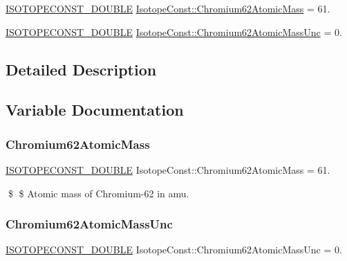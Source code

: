 \begin{DoxyCompactItemize}
\item 
\mbox{\hyperlink{group___isotope_const-_macros_ga8f45a7272ce02c0b4c65c44636ed719a}{I\+S\+O\+T\+O\+P\+E\+C\+O\+N\+S\+T\+\_\+\+D\+O\+U\+B\+LE}} \mbox{\hyperlink{group___isotope_const-_chromium-_cr62_gae5894c5ab7049922a1d31d4ed83e5e1f}{Isotope\+Const\+::\+Chromium62\+Atomic\+Mass}} = 61.
\item 
\mbox{\hyperlink{group___isotope_const-_macros_ga8f45a7272ce02c0b4c65c44636ed719a}{I\+S\+O\+T\+O\+P\+E\+C\+O\+N\+S\+T\+\_\+\+D\+O\+U\+B\+LE}} \mbox{\hyperlink{group___isotope_const-_chromium-_cr62_gabbe815545475c53462adaae7624955f9}{Isotope\+Const\+::\+Chromium62\+Atomic\+Mass\+Unc}} = 0.
\end{DoxyCompactItemize}


\subsection{Detailed Description}


\subsection{Variable Documentation}
\mbox{\label{group___isotope_const-_chromium-_cr62_gae5894c5ab7049922a1d31d4ed83e5e1f}} 
\subsubsection{\texorpdfstring{Chromium62\+Atomic\+Mass}{Chromium62AtomicMass}}
{\footnotesize\ttfamily \mbox{\hyperlink{group___isotope_const-_macros_ga8f45a7272ce02c0b4c65c44636ed719a}{I\+S\+O\+T\+O\+P\+E\+C\+O\+N\+S\+T\+\_\+\+D\+O\+U\+B\+LE}} Isotope\+Const\+::\+Chromium62\+Atomic\+Mass = 61.}

\$ \$ Atomic mass of Chromium-\/62 in amu. \mbox{\label{group___isotope_const-_chromium-_cr62_gabbe815545475c53462adaae7624955f9}} 
\subsubsection{\texorpdfstring{Chromium62\+Atomic\+Mass\+Unc}{Chromium62AtomicMassUnc}}
{\footnotesize\ttfamily \mbox{\hyperlink{group___isotope_const-_macros_ga8f45a7272ce02c0b4c65c44636ed719a}{I\+S\+O\+T\+O\+P\+E\+C\+O\+N\+S\+T\+\_\+\+D\+O\+U\+B\+LE}} Isotope\+Const\+::\+Chromium62\+Atomic\+Mass\+Unc = 0.}

